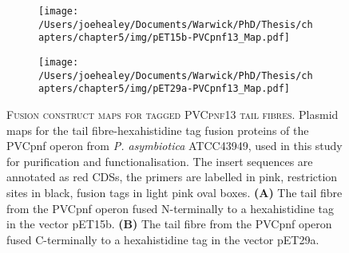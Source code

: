 \begin{figure}[p]

\centering
    \begin{subfigure}{\textwidth}
        \centering
        \texttt{[image: /Users/joehealey/Documents/Warwick/PhD/Thesis/chapters/chapter5/img/pET15b-PVCpnf13\_Map.pdf]}
        \captionsetup{singlelinecheck=off, justification=centering, font=footnotesize, aboveskip=10pt}
        \caption{}
        \label{pET15pnf}
    \end{subfigure}%
    
    \vspace{0.5cm}
    
    \begin{subfigure}{\textwidth}
        \centering
            \texttt{[image: /Users/joehealey/Documents/Warwick/PhD/Thesis/chapters/chapter5/img/pET29a-PVCpnf13\_Map.pdf]}
            \captionsetup{singlelinecheck=off, justification=centering, font=footnotesize, aboveskip=10pt}
            \caption{}
            \label{pET29pnf}
        \end{subfigure}%
	\captionsetup{singlelinecheck=off, justification=justified, font=footnotesize, aboveskip=10pt}
	\caption[Plasmid maps for cloned PVCpnf tail fibre proteins]{\textsc{\normalsize Fusion construct maps for tagged PVCpnf13 tail fibres.}\vspace{0.1cm} \newline Plasmid maps for the tail fibre-hexahistidine tag fusion proteins of the PVCpnf operon from \emph{P. asymbiotica} ATCC43949, used in this study for purification and functionalisation. The insert sequences are annotated as red CDSs, the primers are labelled in pink, restriction sites in black, fusion tags in light pink oval boxes. \textbf{(A)} The tail fibre from the PVCpnf operon fused N-terminally to a hexahistidine tag in the vector pET15b. \textbf{(B)} The tail fibre from the PVCpnf operon fused C-terminally to a hexahistidine tag in the vector pET29a.}
	\label{tailfibreplasmidspnf}
\end{figure}


